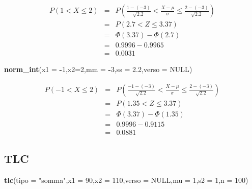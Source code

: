\documentclass[
  11pt,
]{book}
\newenvironment{Shaded}{\begin{snugshade}}{\end{snugshade}}
\newcommand{\AttributeTok}[1]{\textcolor[rgb]{0.13,0.29,0.53}{#1}}
\newcommand{\ConstantTok}[1]{\textcolor[rgb]{0.56,0.35,0.01}{#1}}
\newcommand{\DecValTok}[1]{\textcolor[rgb]{0.00,0.00,0.81}{#1}}
\newcommand{\FloatTok}[1]{\textcolor[rgb]{0.00,0.00,0.81}{#1}}
\newcommand{\FunctionTok}[1]{\textcolor[rgb]{0.13,0.29,0.53}{\textbf{#1}}}
\newcommand{\NormalTok}[1]{#1}
\newcommand{\SpecialCharTok}[1]{\textcolor[rgb]{0.81,0.36,0.00}{\textbf{#1}}}
\newcommand{\StringTok}[1]{\textcolor[rgb]{0.31,0.60,0.02}{#1}}
\theoremstyle{mytheoremstyle}
\theoremstyle{mydefstyle}
\begin{document}
\begin{eqnarray*}
   P( 1 < X \leq  2 ) &=& P\left( \frac { 1  -  ( -3 ) }{\sqrt{ 2.2 }} < \frac { X  -  \mu }{ \sigma } \leq \frac { 2  -  ( -3 ) }{\sqrt{ 2.2 }}\right)  \\
              &=& P\left(  2.7  < Z \leq  3.37 \right) \\
              &=& \Phi( 3.37 )-\Phi( 2.7 )\\
              &=&  0.9996 - 0.9965 \\ 
              &=&  0.0031 
   \end{eqnarray*}

\begin{Shaded}
\begin{Highlighting}[]
\FunctionTok{norm\_int}\NormalTok{(}\AttributeTok{x1 =} \SpecialCharTok{{-}}\DecValTok{1}\NormalTok{,}\AttributeTok{x2=}\DecValTok{2}\NormalTok{,}\AttributeTok{mm =} \SpecialCharTok{{-}}\DecValTok{3}\NormalTok{,}\AttributeTok{ss =} \FloatTok{2.2}\NormalTok{,}\AttributeTok{verso =} \ConstantTok{NULL}\NormalTok{)}
\end{Highlighting}
\end{Shaded}

\begin{eqnarray*}
   P( -1 < X \leq  2 ) &=& P\left( \frac { -1  -  ( -3 ) }{\sqrt{ 2.2 }} < \frac { X  -  \mu }{ \sigma } \leq \frac { 2  -  ( -3 ) }{\sqrt{ 2.2 }}\right)  \\
              &=& P\left(  1.35  < Z \leq  3.37 \right) \\
              &=& \Phi( 3.37 )-\Phi( 1.35 )\\
              &=&  0.9996 - 0.9115 \\ 
              &=&  0.0881 
   \end{eqnarray*}

\subsection{TLC}\label{tlc}

\begin{Shaded}
\begin{Highlighting}[]
\FunctionTok{tlc}\NormalTok{(}\AttributeTok{tipo =} \StringTok{"somma"}\NormalTok{,}\AttributeTok{x1 =} \DecValTok{90}\NormalTok{,}\AttributeTok{x2 =} \DecValTok{110}\NormalTok{,}\AttributeTok{verso =} \ConstantTok{NULL}\NormalTok{,}\AttributeTok{mu =} \DecValTok{1}\NormalTok{,}\AttributeTok{s2 =} \DecValTok{1}\NormalTok{,}\AttributeTok{n =} \DecValTok{100}\NormalTok{)}
\end{Highlighting}
\end{Shaded}
\end{document}
